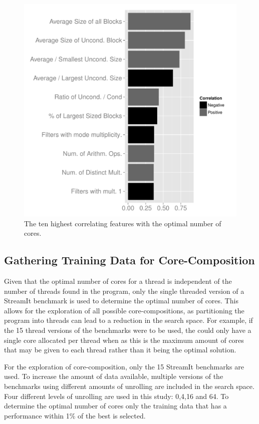 
\begin{figure}[t]
  \includegraphics[width=1\textwidth]{streamit-paper/graphics/coreCorr.pdf}
  \caption{The ten highest correlating features with the optimal number of cores.}\label{fig:corrCore}
\end{figure}


\subsection{Gathering Training Data for Core-Composition}
Given that the optimal number of cores for a thread is independent of the number of threads found in the program, only the single threaded version of a StreamIt benchmark is used to determine the optimal number of cores.
This allows for the exploration of all possible core-compositions, as partitioning the program into threads can lead to a reduction in the search space.
For example, if the 15 thread versions of the benchmarks were to be used, the could only have a single core allocated per thread when as this is the maximum amount of cores that may be given to each thread rather than it being the optimal solution.

For the exploration of core-composition, only the 15 StreamIt benchmarks are used.
To increase the amount of data available, multiple versions of the benchmarks using different amounts of unrolling are included in the search space.
Four different levels of unrolling are used in this study: 0,4,16 and 64.
To determine the optimal number of cores only the training data that has a performance within 1\% of the best is selected.


